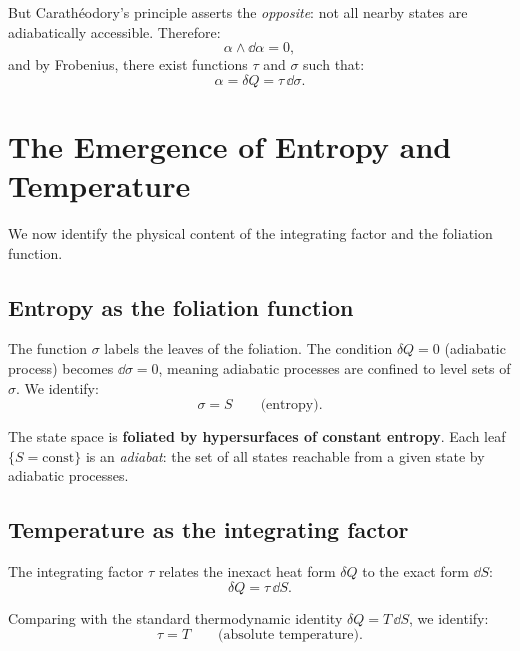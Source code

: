 But Carath\'eodory's principle asserts the \emph{opposite}: not all nearby states are adiabatically accessible. Therefore:
\begin{equation}
\alpha \wedge \dd\alpha = 0,
\end{equation}
and by Frobenius, there exist functions $\tau$ and $\sigma$ such that:
\begin{equation}
\boxed{\alpha = \delta Q = \tau\,\dd\sigma.}
\end{equation}

\section{The Emergence of Entropy and Temperature}

We now identify the physical content of the integrating factor and the foliation function.

\subsection{Entropy as the foliation function}

The function $\sigma$ labels the leaves of the foliation. The condition $\delta Q = 0$ (adiabatic process) becomes $\dd\sigma = 0$, meaning adiabatic processes are confined to level sets of $\sigma$. We identify:
\begin{equation}
\sigma = S \qquad \text{(entropy)}.
\end{equation}

The state space is \textbf{foliated by hypersurfaces of constant entropy}. Each leaf $\{S = \text{const}\}$ is an \emph{adiabat}: the set of all states reachable from a given state by adiabatic processes.

\subsection{Temperature as the integrating factor}

The integrating factor $\tau$ relates the inexact heat form $\delta Q$ to the exact form $\dd S$:
\begin{equation}
\delta Q = \tau\,\dd S.
\end{equation}

Comparing with the standard thermodynamic identity $\delta Q = T\,\dd S$, we identify:
\begin{equation}
\boxed{\tau = T \qquad \text{(absolute temperature)}.}
\end{equation}

